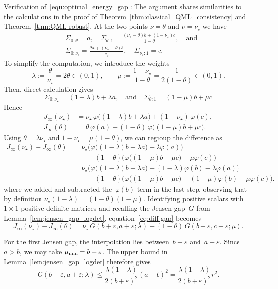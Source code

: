 \documentclass[10pt, letterpaper]{amsart}
\def\min{{\rm min}}
\begin{document}
Verification of~\eqref{equ:optimal_energy_gap}: The argument shares similarities to the calculations in the proof of Theorem~\ref{thm:classical_QML_consistency} and Theorem~\ref{thm:QML-robust}. At the two points $\nu=\theta$ and $\nu=\nu_\star$ we have
\begin{align}
    & \Sigma_{0:\theta}=a,\quad 
\Sigma_{\theta:1}=\frac{(\nu_\star-\theta)b+(1-\nu_\star)c}{1-\theta}, \quad \mbox{and} \\
    & \Sigma_{0:\nu_\star}=\frac{\theta a+(\nu_\star-\theta)b}{\nu_\star},
\quad
\Sigma_{\nu_\star:1}=c.    
\end{align}
To simplify the computation, we introduce the weights
\[
\lambda:=\frac{\theta}{\nu_\star}=2\theta\in(0,1),
\qquad
\mu:=\frac{1-\nu_\star}{1-\theta}=\frac{1}{2(1-\theta)}\in(0,1).
\]
Then, direct calculation gives
\[
\Sigma_{0:\nu_\star}=(1-\lambda)b+\lambda a, 
\quad \mbox{and} \quad 
\Sigma_{\theta:1}=(1-\mu)b+\mu c
\]
Hence
\begin{align}
J_\infty(\nu_\star)
&=\nu_\star\,\varphi\!\big((1-\lambda)b+\lambda a\big)+(1-\nu_\star)\,\varphi(c),\\
J_\infty(\theta)
&=\theta\,\varphi(a)+(1-\theta)\,\varphi\!\big((1-\mu)b+\mu c\big).
\end{align}
Using $\theta=\lambda\nu_\star$ and $1-\nu_\star=\mu(1-\theta)$, we can regroup the difference as 
\begin{align}
J_\infty(\nu_\star)-J_\infty(\theta) &=\nu_\star\Big(\varphi\!\big((1-\lambda)b+\lambda a\big)-\lambda\varphi(a)\Big)\\
&\qquad -(1-\theta)\Big(\varphi\!\big((1-\mu)b+\mu c\big)-\mu\varphi(c)\Big) \\
&=\nu_\star\Big(\varphi\!\big((1-\lambda)b+\lambda a\big)-(1-\lambda)\varphi(b)-\lambda\varphi(a)\Big)\label{eq:diff-gap}\\
&\qquad -(1-\theta)\Big(\varphi\!\big((1-\mu)b+\mu c\big)-(1-\mu)\varphi(b)-\mu\varphi(c)\Big).
\end{align}
where we added and subtracted the~$\varphi(b)$ term in the last step, observing that by definition $\nu_\star (1- \lambda) = (1- \theta) (1- \mu)$. Identifying positive scalars with $1\times1$ positive-definite matrices and recalling the Jensen gap~$G$ from Lemma~\ref{lem:jensen_gap_logdet}, equation~\eqref{eq:diff-gap} becomes
\[
J_\infty(\nu_\star)-J_\infty(\theta)
=\nu_\star\,G(b+\varepsilon,a+\varepsilon;\lambda)
-(1-\theta)\,G(b+\varepsilon,c+\varepsilon;\mu).
\]

For the first Jensen gap, the interpolation lies between~$b+\varepsilon$ and~$a+\varepsilon$. Since~$a>b$, we may take $\mu_{\min}=b+\varepsilon$. The upper bound in Lemma~\ref{lem:jensen_gap_logdet} therefore gives
\begin{equation}\label{eq:gap-upper-simple}
G(b+\varepsilon,a+\varepsilon;\lambda)
\leq
\frac{\lambda(1-\lambda)}{2(b+\varepsilon)^2}(a-b)^2
=
\frac{\lambda(1-\lambda)}{2(b+\varepsilon)^2}r^2.
\end{equation}
\end{document}
